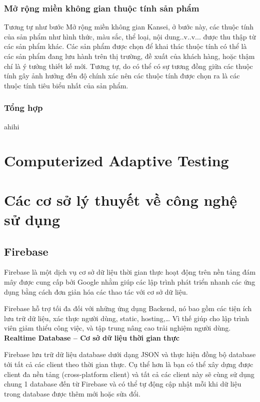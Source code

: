 \subsubsection{Mở rộng miền không gian thuộc tính sản phẩm}

Tương tự như bước Mở rộng miền không gian Kansei, ở bước này, các thuộc tính của sản phẩm như hình thức, màu sắc, thể loại, nội dung..v..v... được thu thập từ các sản phẩm khác. Các sản phẩm được chọn để khai thác thuộc tính có thể là các sản phẩm đang lưu hành trên thị trường, đề xuất của khách hàng, hoặc thậm chí là ý tưởng thiết kế mới. Tương tự, do có thể có sự tương đồng giữa các thuộc tính gây ảnh hưởng đến độ chính xác  nên các thuộc tính được chọn ra là các thuộc tính tiêu biểu nhất của sản phẩm.

\subsubsection{Tổng hợp}

ahihi

\section{Computerized Adaptive Testing}

\section{Các cơ sở lý thuyết về công nghệ sử dụng}
\subsection{Firebase}
Firebase là một dịch vụ cơ sở dữ liệu thời gian thực hoạt động trên nền tảng đám mây được cung cấp bởi Google nhằm giúp các lập trình phát triển nhanh các ứng dụng bằng cách đơn giản hóa các thao tác với cơ sở dữ liệu.

Firebase hỗ trợ tối đa đối với những ứng dụng Backend, nó bao gồm các tiện ích lưu trữ dữ liệu, xác thực người dùng, static, hosting,… Vì thế giúp cho lập trình viên giảm thiểu công việc, và tập trung nâng cao trải nghiệm người dùng.\\

\textbf{Realtime Database – Cơ sở dữ liệu thời gian thực}
 
Firebase lưu trữ dữ liệu database dưới dạng JSON và thực hiện đồng bộ database tới tất cả các client theo thời gian thực. Cụ thể hơn là bạn có thể xây dựng được client đa nền tảng (cross-platform client) và tất cả các client này sẽ cùng sử dụng chung 1 database đến từ Firebase và có thể tự động cập nhật mỗi khi dữ liệu trong database được thêm mới hoặc sửa đổi.
 

